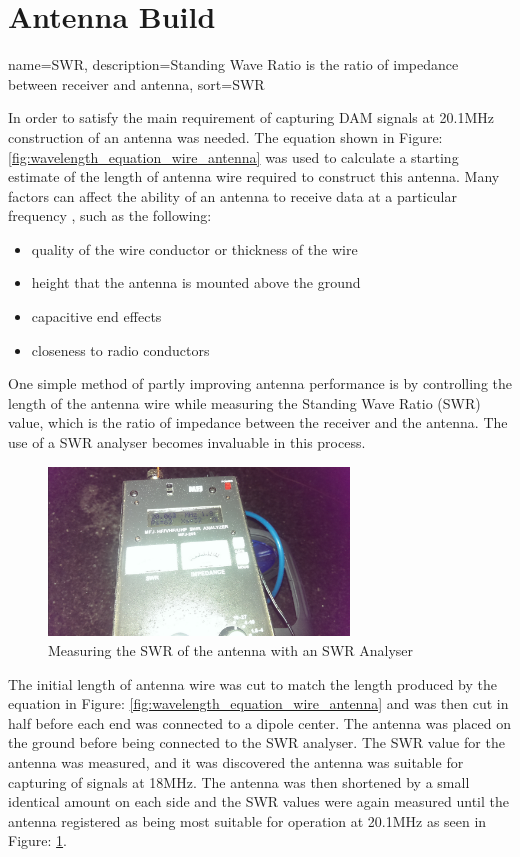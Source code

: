 \documentclass[runningheads,a4paper]{llncs}
\begin{document}
\section*{Antenna Build}

{
  name={SWR},
  description={Standing Wave Ratio is the ratio of impedance between receiver and antenna},
  sort=SWR
}

In order to satisfy the main requirement of capturing \gls{DAM} signals at 20.1MHz construction of an antenna was needed. The equation shown in Figure: \ref{fig:wavelength_equation_wire_antenna} was used to calculate a starting estimate of the length of antenna wire required to construct this antenna. Many factors can affect the ability of an antenna to receive data at a particular frequency \citep{arrl-00}, such as the following:

\begin{itemize}
	\item quality of the wire conductor or thickness of the wire
	\item height that the antenna is mounted above the ground
	\item capacitive end effects
	\item closeness to radio conductors
\end{itemize}

One simple method of partly improving antenna performance is by controlling the length of the antenna wire while measuring the Standing Wave Ratio (\gls{SWR}) value, which is the ratio of impedance between the receiver and the antenna. The use of a \gls{SWR} analyser becomes invaluable in this process.

%
\begin{figure}[here]
\centering
\includegraphics[width=8cm]{images/34}
\caption{Measuring the SWR of the antenna with an SWR Analyser}
\label{fig:swr_analyser_measuring_antenna}
\end{figure}
%

The initial length of antenna wire was cut to match the length produced by the equation in Figure: \ref{fig:wavelength_equation_wire_antenna} and was then cut in half before each end was connected to a dipole center. The antenna was placed on the ground before being connected to the \gls{SWR} analyser. The \gls{SWR} value for the antenna was measured, and it was discovered the antenna was suitable for capturing of signals at 18MHz. The antenna was then shortened by a small identical amount on each side and the \gls{SWR} values were again measured until the antenna registered as being most suitable for operation at 20.1MHz as seen in Figure:  \ref{fig:swr_analyser_measuring_antenna}. 
\end{document}
